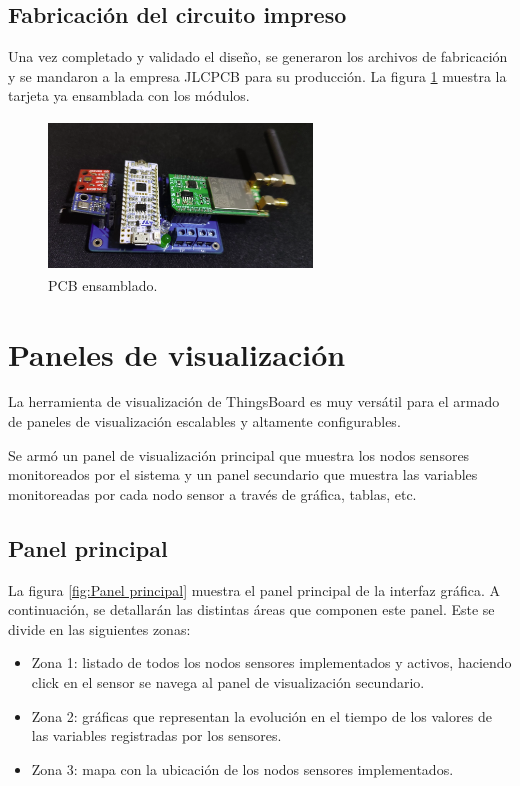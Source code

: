 \subsection{Fabricación del circuito impreso} 
Una vez completado y validado el diseño, se generaron los archivos de fabricación y se mandaron a la empresa JLCPCB para su producción. La figura \ref{fig:PCB ensamblado} muestra la tarjeta ya ensamblada con los módulos. 
\begin{figure}[h!]
  \centering
	\includegraphics[width=7cm, height=4cm]{./Figures/hardware_vistalateral.png}
  \caption{PCB ensamblado.}
	\label{fig:PCB ensamblado}
\end{figure}

\section{Paneles de visualización}
La herramienta de visualización de ThingsBoard es muy versátil para el armado de paneles de visualización escalables y altamente configurables.

Se armó un panel de visualización principal que muestra los nodos sensores monitoreados por el sistema y un panel secundario que muestra las variables monitoreadas por cada nodo sensor a través de gráfica, tablas, etc.

\subsection{Panel principal} 
La figura \ref{fig:Panel principal} muestra el panel principal de la interfaz gráfica. A continuación, se detallarán las distintas áreas que componen este panel. Este se divide en las siguientes zonas:

\begin{itemize}
  \item Zona 1: listado de todos los nodos sensores implementados y activos, haciendo click en el sensor se navega al panel de visualización secundario.
  \item Zona 2: gráficas que representan la evolución en el tiempo de los valores de las variables registradas por los sensores.
  \item Zona 3: mapa con la ubicación de los nodos sensores implementados.
\end{itemize}

